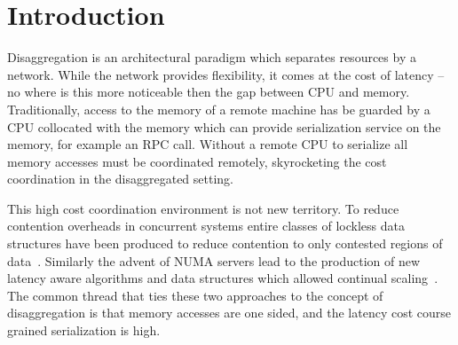 

%




\section{Introduction}

Disaggregation is an architectural paradigm which separates resources by a
network. While the network provides flexibility, it comes at the cost of latency
-- no where is this more noticeable then the gap between CPU and memory.
Traditionally, access to the memory of a remote machine has be guarded by a CPU
collocated with the memory which can provide serialization service on the
memory, for example an RPC call. Without a remote CPU to serialize all memory
accesses must be coordinated remotely, skyrocketing the cost coordination in the
disaggregated setting.

This high cost coordination environment is not new territory. To reduce
contention overheads in concurrent systems entire classes of lockless data
structures have been produced to reduce contention to only contested regions of
data~\cite{}. Similarly the advent of NUMA
servers lead to the production of new latency aware algorithms and data
structures which allowed continual
scaling~\cite{linux-scale,black-box-numa}. The common
thread that ties these two approaches to the concept of disaggregation is that
memory accesses are one sided, and the latency cost course grained serialization
is high.

